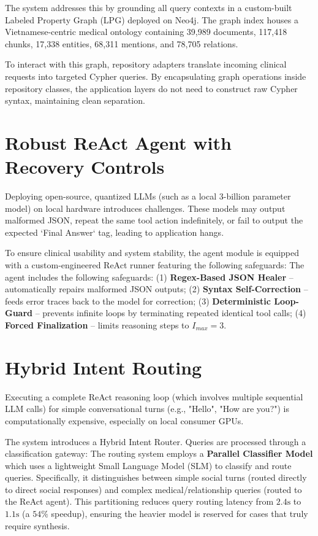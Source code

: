 \documentclass[../main.tex]{subfiles}
\begin{document}
The system addresses this by grounding all query contexts in a custom-built Labeled Property Graph (LPG) deployed on Neo4j. The graph index houses a Vietnamese-centric medical ontology containing 39,989 documents, 117,418 chunks, 17,338 entities, 68,311 mentions, and 78,705 relations. 

To interact with this graph, repository adapters translate incoming clinical requests into targeted Cypher queries. By encapsulating graph operations inside repository classes, the application layers do not need to construct raw Cypher syntax, maintaining clean separation.

\section{Robust ReAct Agent with Recovery Controls}
Deploying open-source, quantized LLMs (such as a local 3-billion parameter model) on local hardware introduces challenges. These models may output malformed JSON, repeat the same tool action indefinitely, or fail to output the expected `Final Answer` tag, leading to application hangs.

To ensure clinical usability and system stability, the agent module is equipped with a custom-engineered ReAct runner featuring the following safeguards:
The agent includes the following safeguards: (1) \textbf{Regex-Based JSON Healer} – automatically repairs malformed JSON outputs; (2) \textbf{Syntax Self-Correction} – feeds error traces back to the model for correction; (3) \textbf{Deterministic Loop-Guard} – prevents infinite loops by terminating repeated identical tool calls; (4) \textbf{Forced Finalization} – limits reasoning steps to $I_{max}=3$.

\section{Hybrid Intent Routing}
Executing a complete ReAct reasoning loop (which involves multiple sequential LLM calls) for simple conversational turns (e.g., "Hello", "How are you?") is computationally expensive, especially on local consumer GPUs.

The system introduces a Hybrid Intent Router. Queries are processed through a classification gateway:
The routing system employs a \textbf{Parallel Classifier Model} which uses a lightweight Small Language Model (SLM) to classify and route queries. Specifically, it distinguishes between simple social turns (routed directly to direct social responses) and complex medical/relationship queries (routed to the ReAct agent).
This partitioning reduces query routing latency from $2.4\text{s}$ to $1.1\text{s}$ (a $54\%$ speedup), ensuring the heavier model is reserved for cases that truly require synthesis.
\end{document}
